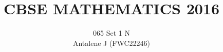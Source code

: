 \documentclass[journal,12pt,onecolumn]{IEEEtran}
\DeclareMathOperator*{\Res}{Res}
\begin{document}
\newtheorem{theorem}{Theorem}[section]
\newtheorem{problem}{Problem}
\newtheorem{proposition}{Proposition}[section]
\newtheorem{lemma}{Lemma}[section]
\newtheorem{corollary}[theorem]{Corollary}
\newtheorem{example}{Example}[section]
\newtheorem{definition}[problem]{Definition}
\newcommand{\BEQA}{\begin{eqnarray}}
\newcommand{\EEQA}{\end{eqnarray}}
\newcommand{\define}{\stackrel{\triangle}{=}}

\providecommand{\mbf}{\mathbf}
\providecommand{\pr}[1]{\ensuremath{\Pr\left(#1\right)}}
\providecommand{\qfunc}[1]{\ensuremath{Q\left(#1\right)}}
\providecommand{\sbrak}[1]{\ensuremath{{}\left[#1\right]}}
\providecommand{\lsbrak}[1]{\ensuremath{{}\left[#1\right.}}
\providecommand{\rsbrak}[1]{\ensuremath{{}\left.#1\right]}}
\providecommand{\brak}[1]{\ensuremath{\left(#1\right)}}
\providecommand{\lbrak}[1]{\ensuremath{\left(#1\right.}}
\providecommand{\rbrak}[1]{\ensuremath{\left.#1\right)}}
\providecommand{\cbrak}[1]{\ensuremath{\left\{#1\right\}}}
\providecommand{\lcbrak}[1]{\ensuremath{\left\{#1\right.}}
\providecommand{\rcbrak}[1]{\ensuremath{\left.#1\right\}}}
\theoremstyle{remark}
\newtheorem{rem}{Remark}
\newcommand{\sgn}{\mathop{\mathrm{sgn}}}
\providecommand{\abs}[1]{\left\vert#1\right\vert}
\providecommand{\res}[1]{\Res\displaylimits_{#1}} 
\providecommand{\norm}[1]{\left\lVert#1\right\rVert}
\providecommand{\mtx}[1]{\mathbf{#1}}
\providecommand{\mean}[1]{E\left[ #1 \right]}
\providecommand{\fourier}{\overset{\mathcal{F}}{ \rightleftharpoons}}
\providecommand{\system}{\overset{\mathcal{H}}{ \longleftrightarrow}}
\newcommand{\solution}{\noindent \textbf{Solution: }}
\newcommand{\cosec}{\,\text{cosec}\,}
\providecommand{\dec}[2]{\ensuremath{\overset{#1}{\underset{#2}{\gtrless}}}}
\newcommand{\myvec}[1]{\ensuremath{\begin{pmatrix}#1\end{pmatrix}}}
\newcommand{\mydet}[1]{\ensuremath{\begin{vmatrix}#1\end{vmatrix}}}
\makeatletter
{}
\makeatother
\let\StandardTheFigure\thefigure
\let\vec\mathbf
\renewcommand{\thefigure}{\theproblem}
\def\putbox#1#2#3{\makebox[0in][l]{\makebox[#1][l]{}\raisebox{\baselineskip}[0in][0in]{\raisebox{#2}[0in][0in]{#3}}}}
     \def\rightbox#1{\makebox[0in][r]{#1}}
     \def\centbox#1{\makebox[0in]{#1}}
     \def\topbox#1{\raisebox{-\baselineskip}[0in][0in]{#1}}
     \def\midbox#1{\raisebox{-0.5\baselineskip}[0in][0in]{#1}}
\vspace{3cm}
\title{CBSE MATHEMATICS 2016}
\author{065 Set 1 N\\
Antalene J (FWC22246)}
\maketitle
\bigskip
\renewcommand{\thefigure}{\theenumi}
\renewcommand{\thetable}{\theenumi}
\end{document}
